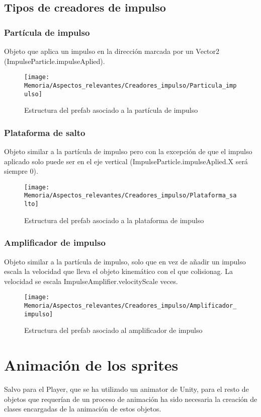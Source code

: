 \subsection{Tipos de creadores de impulso}
\subsubsection{Partícula de impulso}
Objeto que aplica un impulso en la dirección marcada por un Vector2 (ImpulseParticle.impulseAplied).

\begin{figure}[h]
\texttt{[image: Memoria/Aspectos\_relevantes/Creadores\_impulso/Particula\_impulso]}
\caption{Estructura del prefab asociado a la partícula de impulso}
\end{figure}

\subsubsection{Plataforma de salto}
Objeto similar a la partícula de impulso pero con la excepción de que el impulso aplicado solo puede ser en el eje vertical (ImpulseParticle.impulseAplied.X será siempre 0).

\begin{figure}[h]
\texttt{[image: Memoria/Aspectos\_relevantes/Creadores\_impulso/Plataforma\_salto]}
\caption{Estructura del prefab asociado a la plataforma de impulso}
\end{figure}

\subsubsection{Amplificador de impulso}
Objeto similar a la partícula de impulso, solo que en vez de añadir un impulso escala la velocidad que lleva el objeto kinemático con el que colisionag. La velocidad se escala ImpulseAmplifier.velocityScale veces.

\begin{figure}[h]
\texttt{[image: Memoria/Aspectos\_relevantes/Creadores\_impulso/Amplificador\_impulso]}
\caption{Estructura del prefab asociado al amplificador de impulso}
\end{figure}

\section{Animación de los sprites}
Salvo para el Player, que se ha utilizado un animator de Unity, para el resto de objetos que requerían de un proceso de animación ha sido necesaria la creación de clases encargadas de la animación de estos objetos.\\

